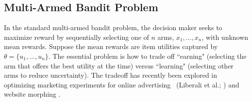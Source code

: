 \documentclass[nonblindrev]{informs3}
\begin{document}






\subsection{Multi-Armed Bandit Problem}

In the standard multi-armed bandit problem, the decision maker seeks to maximize reward by sequentially selecting one of $n$ arms, $x_1,\ldots,x_n$, with unknown mean rewards. Suppose the mean rewards are item utilities captured by $\theta = \{u_1, \ldots, u_n\}$. The essential problem is how to trade off ``earning" (selecting the arm that offers the best utility at the time) versus ``learning" (selecting other arms to reduce uncertainty). The tradeoff has recently been explored in optimizing marketing experiments for online advertising ~(Liberali et al.; \cite{schwartzetal2017,urban2013morphing}) and website morphing \citep{hauser2009website}. 
\end{document}
